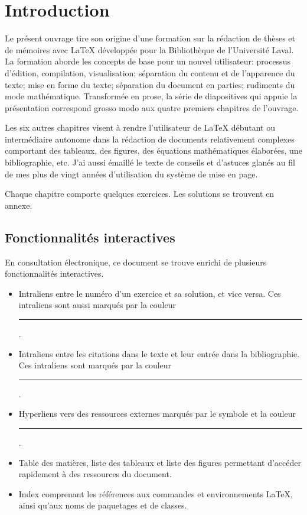 
\chapter{Introduction}
\label{chap:introduction}

Le présent ouvrage tire son origine d'une formation sur la rédaction
de thèses et de mémoires avec {\LaTeX} développée pour la Bibliothèque
de l'Université Laval. La formation aborde les concepts de base pour
un nouvel utilisateur: processus d'édition, compilation,
visualisation; séparation du contenu et de l'apparence du texte; mise
en forme du texte; séparation du document en parties; rudiments du
mode mathématique. Transformée en prose, la série de diapositives qui
appuie la présentation correspond grosso modo aux quatre premiers
chapitres de l'ouvrage.

Les six autres chapitres visent à rendre l'utilisateur de {\LaTeX}
débutant ou intermédiaire autonome dans la rédaction de documents
relativement complexes comportant des tableaux, des figures, des
équations mathématiques élaborées, une bibliographie, etc. J'ai aussi
émaillé le texte de conseils et d'astuces glanés au fil de mes plus de
vingt années d'utilisation du système de mise en page.

Chaque chapitre comporte quelques exercices. Les solutions se trouvent
en annexe.

\section*{Fonctionnalités interactives}

En consultation électronique, ce document se trouve enrichi de
plusieurs fonctionnalités interactives.
\begin{itemize}
\item Intraliens entre le numéro d'un exercice et sa solution, et vice
  versa. Ces intraliens sont aussi marqués par la couleur
  \textcolor{link}{\rule{1.5em}{1.2ex}}.
\item Intraliens entre les citations dans le texte et leur entrée dans
  la bibliographie. Ces intraliens sont marqués par la couleur
  \textcolor{citation}{\rule{1.5em}{1.2ex}}.
\item Hyperliens vers des ressources externes marqués par le symbole
  {\faExternalLink*} et la couleur
  \textcolor{url}{\rule{1.5em}{1.2ex}}.
\item Table des matières, liste des tableaux et liste des figures
  permettant d'accéder rapidement à des ressources du document.
\item Index comprenant les références aux commandes et environnements
  {\LaTeX}, ainsi qu'aux noms de paquetages et de classes.
\end{itemize}

